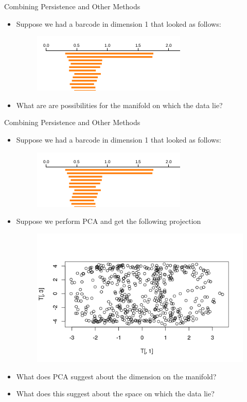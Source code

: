 \begin{frame}{Combining Persistence and Other Methods}
\begin{itemize}
\item Suppose we had a barcode in dimension 1 that looked as follows:
\begin{figure}
\includegraphics[scale=0.5]{images/torusbar.png}
\end{figure}
\item What are are possibilities for the manifold on which the data lie?
\end{itemize}
\end{frame}
\begin{frame}{Combining Persistence and Other Methods}
\begin{itemize}
\item Suppose we had a barcode in dimension 1 that looked as follows:
\begin{figure}
\includegraphics[scale=0.5]{images/torusbar.png}
\end{figure}
\item Suppose we perform PCA and get the following projection
\begin{figure}
\includegraphics[scale=0.3]{images/torusPCA.png}
\end{figure}
\item What does PCA suggest about the dimension on the manifold? 
\item What does this suggest about the space on which the data lie?
\end{itemize}
\end{frame}